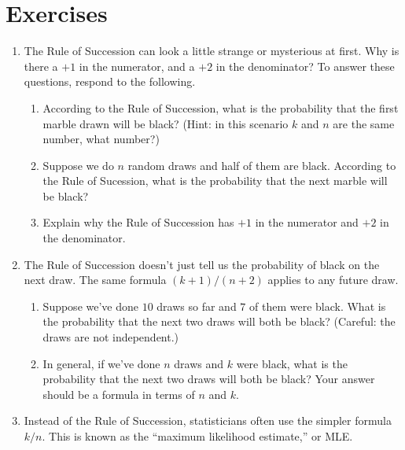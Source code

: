\documentclass[justified]{tufte-book}
\providecommand{\tightlist}{%
  \setlength{\itemsep}{0pt}\setlength{\parskip}{0pt}}
\theoremstyle{definition}
\theoremstyle{definition}
\theoremstyle{definition}
\theoremstyle{definition}
\theoremstyle{remark}
\begin{document}
\hypertarget{exercises-8}{%
\section*{Exercises}\label{exercises-8}}

\begin{enumerate}
\item
  The Rule of Succession can look a little strange or mysterious at first. Why is there a \(+1\) in the numerator, and a \(+2\) in the denominator? To answer these questions, respond to the following.

  \begin{enumerate}
  \def\labelenumii{\alph{enumii}.}
  \tightlist
  \item
    According to the Rule of Succession, what is the probability that the first marble drawn will be black? (Hint: in this scenario \(k\) and \(n\) are the same number, what number?)
  \item
    Suppose we do \(n\) random draws and half of them are black. According to the Rule of Sucession, what is the probability that the next marble will be black?
  \item
    Explain why the Rule of Succession has \(+1\) in the numerator and \(+2\) in the denominator.
  \end{enumerate}
\item
  The Rule of Succession doesn't just tell us the probability of black on the next draw. The same formula \((k+1)/(n+2)\) applies to any future draw.

  \begin{enumerate}
  \def\labelenumii{\alph{enumii}.}
  \tightlist
  \item
    Suppose we've done \(10\) draws so far and \(7\) of them were black. What is the probability that the next two draws will both be black? (Careful: the draws are not independent.)
  \item
    In general, if we've done \(n\) draws and \(k\) were black, what is the probability that the next two draws will both be black? Your answer should be a formula in terms of \(n\) and \(k\).
  \end{enumerate}
\item
  Instead of the Rule of Succession, statisticians often use the simpler formula \(k/n\). This is known as the ``maximum likelihood estimate,'' or MLE.


\end{enumerate}
\end{document}
